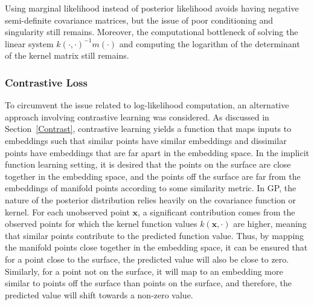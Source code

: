             Using marginal likelihood instead of posterior likelihood avoids having negative semi-definite covariance matrices, but the issue of poor conditioning and singularity still remains. Moreover, the computational bottleneck of solving the linear system $k(\cdot, \cdot)^{-1} m(\cdot)$ and computing the logarithm of the determinant of the kernel matrix still remains.
            
            
            \subsubsection{Contrastive Loss}
            To circumvent the issue related to log-likelihood computation, an alternative approach involving contrastive learning was considered. As discussed in Section~\ref{Contrast}, contrastive learning yields a function that maps inputs to embeddings such that similar points have similar embeddings and dissimilar points have embeddings that are far apart in the embedding space. In the implicit function learning setting, it is desired that the points on the surface are close together in the embedding space, and the points off the surface are far from the embeddings of manifold points according to some similarity metric. In GP, the nature of the posterior distribution relies heavily on the covariance function or kernel. For each unobserved point $\mathbf{x}$, a significant contribution comes from the observed points for which the kernel function values $k(\mathbf{x}, \cdot)$ are higher, meaning that similar points contribute to the predicted function value. Thus, by mapping the manifold points close together in the embedding space, it can be ensured that for a point close to the surface, the predicted value will also be close to zero. Similarly, for a point not on the surface, it will map to an embedding more similar to points off the surface than points on the surface, and therefore, the predicted value will shift towards a non-zero value.
            \newline

